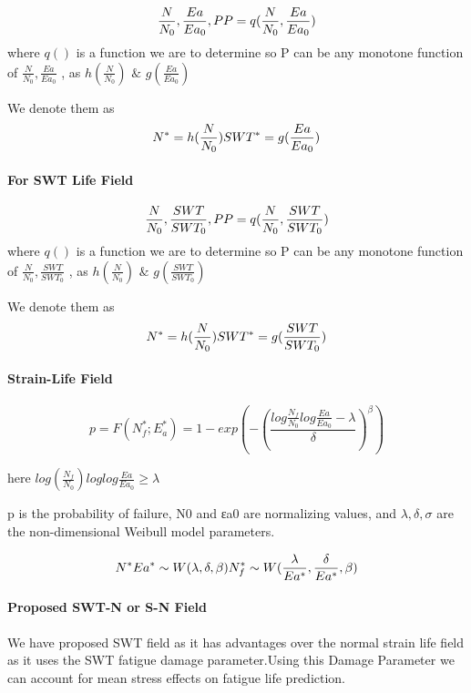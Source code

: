 \documentclass[11pt]{article}
\begin{document}
\[
\frac{N}{N_0},\frac{Ea}{Ea_0},P \\
P = q(\frac{N}{N_0},\frac{Ea}{Ea_0})
\] where \(q()\) is a function we are to determine so P can be any
monotone function of \(\frac{N}{N_0},\frac{Ea}{Ea_0}\) , as
\(h(\frac{N}{N_0})\) \(\&\) \(g(\frac{Ea}{Ea_0})\)

We denote them as \[
N^* = h(\frac{N}{N_0}) \\
SWT^* = g(\frac{Ea}{Ea_0})
\]

\hypertarget{for-swt-life-field}{%
\paragraph{For SWT Life Field}\label{for-swt-life-field}}

\[
\frac{N}{N_0},\frac{SWT}{SWT_0},P \\
P = q(\frac{N}{N_0},\frac{SWT}{SWT_0})
\] where \(q()\) is a function we are to determine so P can be any
monotone function of \(\frac{N}{N_0},\frac{SWT}{SWT_0}\) , as
\(h(\frac{N}{N_0})\) \(\&\) \(g(\frac{SWT}{SWT_0})\)

We denote them as \[
N^* = h(\frac{N}{N_0}) \\
SWT^* = g(\frac{SWT}{SWT_0})
\]

\hypertarget{strain-life-field}{%
\paragraph{Strain-Life Field}\label{strain-life-field}}

\[
p = F(N^*_f;E^*_a) = 1 - exp(-(\frac{log\frac{N_f}{N_0}log\frac{Ea}{Ea_0}-\lambda}{\delta})^\beta)
\]

here \(log(\frac{N_f}{N_0})loglog\frac{Ea}{Ea_0} \geq \lambda\)

p is the probability of failure, N0 and εa0 are normalizing values, and
\(\lambda,\delta,\sigma\) are the non-dimensional Weibull model
parameters.

\[
N^*Ea^* \sim W(\lambda,\delta,\beta) \\
N^*_f\sim W(\frac{\lambda}{Ea^* },\frac{\delta}{Ea^* },\beta) \\
\]

\hypertarget{proposed-swt-n-or-s-n-field}{%
\paragraph{Proposed SWT-N or S-N
Field}\label{proposed-swt-n-or-s-n-field}}

We have proposed SWT field as it has advantages over the normal strain
life field as it uses the SWT fatigue damage parameter.Using this Damage
Parameter we can account for mean stress effects on fatigue life
prediction.
\end{document}
